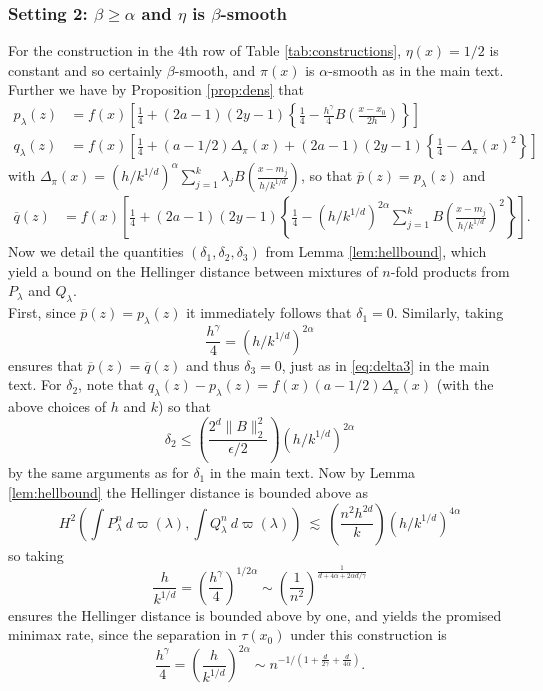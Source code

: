 \documentclass[11pt,twoside]{article}
\theoremstyle{definition}
\theoremstyle{remark}
\begin{document}
\subsubsection{Setting 2: $\beta \geq \alpha$ and $\eta$ is $\beta$-smooth}

For the construction in the 4th row of Table \ref{tab:constructions}, $\eta(x)=1/2$ is constant and so certainly $\beta$-smooth, and $\pi(x)$ is $\alpha$-smooth as in the main text. Further we have by Proposition \ref{prop:dens} that
\begin{align*}
p_\lambda(z) &= f(x)  \left[ \frac{1}{4}   + (2a-1)(2y-1) \left\{ \frac{1}{4} - \frac{h^\gamma}{4} B\left( \frac{x-x_0}{2h} \right) \right\} \right] \\
q_\lambda(z) &= f(x)  \left[ \frac{1}{4} + (a-1/2) \Delta_\pi(x)  + (2a-1)(2y-1)  \left\{ \frac{1}{4} - \Delta_\pi(x)^2 \right\}  \right]
\end{align*}
with $\Delta_\pi(x)= \left(h/k^{1/d} \right)^\alpha \sum_{j=1}^k \lambda_j B\left( \frac{x-m_j}{h/k^{1/d}} \right)$, so that $\overline{p}(z) = p_\lambda(z)$ and
\begin{align*}
\overline{q}(z) &= f(x)  \left[ \frac{1}{4}  + (2a-1)(2y-1)  \left\{ \frac{1}{4} - \left(h/k^{1/d} \right)^{2\alpha} \sum_{j=1}^k B\left( \frac{x-m_j}{h/k^{1/d}} \right)^2 \right\}  \right] .
\end{align*}
Now we detail the quantities $(\delta_1,\delta_2,\delta_3)$ from Lemma \ref{lem:hellbound}, which yield a bound on the Hellinger distance between mixtures of $n$-fold products from $P_\lambda$ and $Q_\lambda$. \\

First, since $\overline{p}(z) = p_\lambda(z)$ it immediately follows that $\delta_1=0$. Similarly, taking 
$$ \frac{h^\gamma}{4} = \left(h/k^{1/d} \right)^{2\alpha} $$
ensures that $\overline{p}(z)=\overline{q}(z)$ and thus $\delta_3=0$, just as in \eqref{eq:delta3} in the main text. 
For $\delta_2$, note that  $q_\lambda(z) - p_\lambda(z) = f(x)(a-1/2) \Delta_\pi(x)$ (with the above choices of $h$ and $k$)
so that
$$ \delta_2 \leq \left( \frac{2^d \|B \|_2^2}{\epsilon/2} \right)  \left( h/k^{1/d} \right)^{2\alpha} $$
by the same arguments as for $\delta_1$ in the main text. Now by Lemma \ref{lem:hellbound} the Hellinger distance is bounded above as
$$ H^2\left(\int P_\lambda^n \ d\varpi(\lambda), \int Q_\lambda^n \ d\varpi(\lambda) \right) \ \lesssim \  \left( \frac{n^2 h^{2d}}{k} \right)  \left( h/k^{1/d} \right)^{4\alpha} $$  
so taking 
$$ \frac{h}{k^{1/d}} = \left( \frac{h^\gamma}{4} \right)^{1/2\alpha} \sim \left( \frac{1}{n^2} \right)^{\frac{1}{d+ 4\alpha+2\alpha d/\gamma}} $$
ensures the Hellinger distance is bounded above by one, and yields the promised minimax rate, since the separation in $\tau(x_0)$ under this construction is
$$ \frac{h^\gamma}{4} = \left( \frac{h}{k^{1/d}} \right)^{2\alpha} \sim n^{-1/\left(1 + \frac{d}{2\gamma} + \frac{d}{4 \alpha} \right) } .  $$
\end{document}
